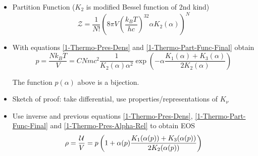 \begin{frame}
	\begin{itemize}[<+->]
		\item Partition Function ($K_2$ is modified Bessel function of 2nd kind)
		\begin{equation}
			\mathcal{Z} = \frac{1}{N!}\left(8\pi V\left(\frac{k_BT}{hc}\right)^32\alpha K_2(\alpha)\right)^N
			\label{1-Thermo-Part-Func-Final}
		\end{equation}
		\item With equations \ref{1-Thermo-Pres-Dens} and \ref{1-Thermo-Part-Func-Final} obtain
		\begin{equation}
			p = \frac{Nk_BT}{V} = CNmc^2\frac{1}{K_2(\alpha)\alpha^2}\exp\left(-\alpha\frac{K_1(\alpha)+K_3(\alpha)}{2K_2(\alpha)}\right)
			\label{1-Thermo-Pres-Alpha-Rel}
		\end{equation}
		\begin{theorem}
			The function $p(\alpha)$ above is a bijection.
		\end{theorem}
		\item Sketch of proof: take differential, use properties/representations of $K_\nu$
		\item Use inverse and previous equations \ref{1-Thermo-Pres-Dens}, \ref{1-Thermo-Part-Func-Final} and \ref{1-Thermo-Pres-Alpha-Rel} to obtain EOS
		\begin{equation}
			\rho = \frac{\mathcal{U}}{V} = p\left(1+\alpha(p)\frac{K_1(\alpha(p))+K_3(\alpha(p))}{2K_2(\alpha(p))}\right)
		\end{equation}
	\end{itemize}
\end{frame}



